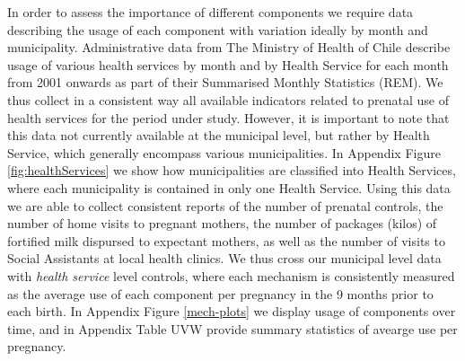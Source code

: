 \documentclass[12pt]{article}
\begin{document}
\begin{spacing}{1.4}
In order to assess the importance of different components we require data
describing the usage of each component with variation ideally by month and
municipality.  Administrative data from The Ministry of Health of Chile
describe usage of various health services by month and by Health Service
for each month from 2001 onwards as part of their Summarised Monthly
Statistics (REM).  We thus collect in a consistent way all available indicators
related to prenatal use of health services for the period under study.  However,
it is important to note that this data not currently available at the municipal
level, but rather by Health Service, which generally encompass various
municipalities.  In Appendix Figure \ref{fig:healthServices} we show how
municipalities are
classified into Health Services, where each municipality is contained in only
one Health Service.  Using this data we are able to collect consistent reports
of the number of prenatal controls, the number of home visits to pregnant
mothers, the number of packages (kilos) of fortified milk dispursed to expectant
mothers, as well as the number of visits to Social Assistants at local health
clinics.   We thus cross our municipal level data with \emph{health service}
level controls, where each mechanism is consistently measured as the average
use of each component per pregnancy in the 9 months prior to each birth.
In Appendix Figure \ref{mech-plots} we display usage of components over
time, and in Appendix Table UVW provide summary statistics of avearge
use per pregnancy.


\end{spacing}
\end{document}
